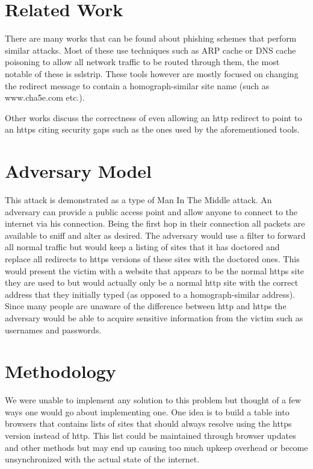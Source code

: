\documentclass{article}
\begin{document}
\section{Related Work}
There are many works that can be found about phishing schemes that perform similar attacks.  Most of these use techniques such as ARP cache or DNS cache poisoning to allow all network traffic to be routed through them, the most notable of these is sslstrip.  These tools however are mostly focused on changing the redirect message to contain a homograph-similar site name (such as www.cha5e.com etc.).

Other works discuss the correctness of even allowing an http redirect to point to an https citing security gaps such as the ones used by the aforementioned tools.

\section{Adversary Model}
This attack is demonstrated as a type of Man In The Middle attack.  An adversary can provide a public access point and allow anyone to connect to the internet via his connection.  Being the first hop in their connection all packets are available to sniff and alter as desired.  The adversary would use a filter to forward all normal traffic but would keep a listing of sites that it has doctored and replace all redirects to https versions of these sites with the doctored ones.  This would present the victim with a website that appears to be the normal https site they are used to but would actually only be a normal http site with the correct address that they initially typed (as opposed to a homograph-similar address).  Since many people are unaware of the difference between http and https the adversary would be able to acquire sensitive information from the victim such as usernames and passwords.


\section{Methodology}
We were unable to implement any solution to this problem but thought of a few ways one would go about implementing one.
One idea is to build a table into browsers that contains lists of sites that should always resolve using the https version instead of http.  This list could be maintained through browser updates and other methods but may end up causing too much upkeep overhead or become unsynchronized with the actual state of the internet.
\end{document}
